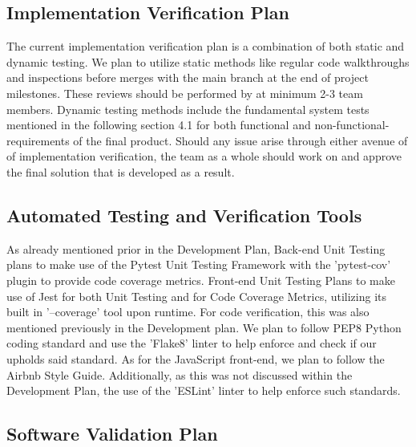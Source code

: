 \documentclass[12pt, titlepage]{article}
\begin{document}
\subsection{Implementation Verification Plan}

The current implementation verification plan is a combination of both static and dynamic testing.  We plan to utilize static methods like regular code walkthroughs and inspections before merges with the main branch at the end of project milestones.  These reviews should be performed by at minimum 2-3 team members. Dynamic testing methods include the fundamental system tests mentioned in the following section 4.1 for both functional and non-functional-requirements of the final product. Should any issue arise through either avenue of of implementation verification, the team as a whole should work on and approve the final solution that is developed as a result.

\subsection{Automated Testing and Verification Tools}

As already mentioned prior in the Development Plan, Back-end Unit Testing plans to make use of the Pytest Unit Testing Framework with the 'pytest-cov' plugin to provide code coverage metrics. Front-end Unit Testing Plans to make use of Jest for both Unit Testing and for Code Coverage Metrics, utilizing its built in '--coverage' tool upon runtime.\newline
\indent For code verification, this was also mentioned previously in the Development plan. We plan to follow PEP8 Python coding standard and use the 'Flake8' linter to help enforce and check if our upholds said standard. As for the JavaScript front-end, we plan to follow the Airbnb Style Guide. Additionally, as this was not discussed within the Development Plan, the use of the 'ESLint' linter to help enforce such standards.

\subsection{Software Validation Plan}
\end{document}

